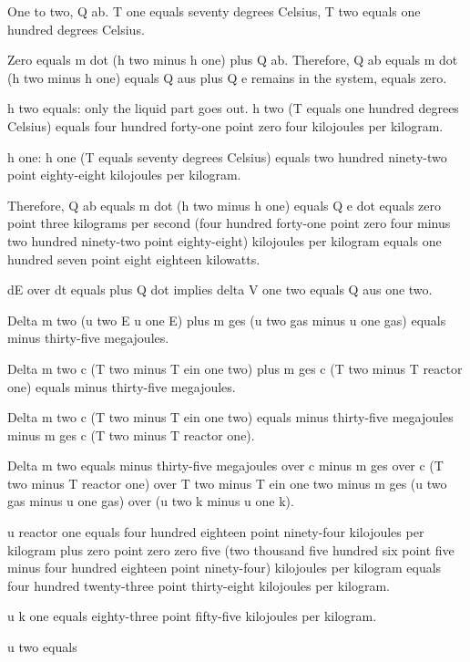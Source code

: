 One to two, Q ab. T one equals seventy degrees Celsius, T two equals one hundred degrees Celsius.

Zero equals m dot (h two minus h one) plus Q ab. Therefore, Q ab equals m dot (h two minus h one) equals Q aus plus Q e remains in the system, equals zero.

h two equals: only the liquid part goes out. h two (T equals one hundred degrees Celsius) equals four hundred forty-one point zero four kilojoules per kilogram.

h one: h one (T equals seventy degrees Celsius) equals two hundred ninety-two point eighty-eight kilojoules per kilogram.

Therefore, Q ab equals m dot (h two minus h one) equals Q e dot equals zero point three kilograms per second (four hundred forty-one point zero four minus two hundred ninety-two point eighty-eight) kilojoules per kilogram equals one hundred seven point eight eighteen kilowatts.

dE over dt equals plus Q dot implies delta V one two equals Q aus one two.

Delta m two (u two E u one E) plus m ges (u two gas minus u one gas) equals minus thirty-five megajoules.

Delta m two c (T two minus T ein one two) plus m ges c (T two minus T reactor one) equals minus thirty-five megajoules.

Delta m two c (T two minus T ein one two) equals minus thirty-five megajoules minus m ges c (T two minus T reactor one).

Delta m two equals minus thirty-five megajoules over c minus m ges over c (T two minus T reactor one) over T two minus T ein one two minus m ges (u two gas minus u one gas) over (u two k minus u one k).

u reactor one equals four hundred eighteen point ninety-four kilojoules per kilogram plus zero point zero zero five (two thousand five hundred six point five minus four hundred eighteen point ninety-four) kilojoules per kilogram equals four hundred twenty-three point thirty-eight kilojoules per kilogram.

u k one equals eighty-three point fifty-five kilojoules per kilogram.

u two equals